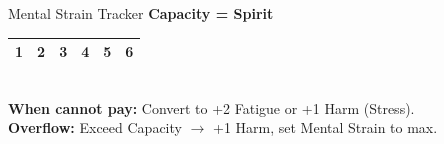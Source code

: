 \documentclass[10pt]{article}
\begin{document}
\begin{minipage}[t]{0.48\linewidth}
    \vspace{0.5em}
    
    \begin{charbox}{Mental Strain Tracker}
        \textbf{Capacity = Spirit} \underline{\hspace{1.5cm}}\\
        \begin{tabular}{|p{1cm}|p{1cm}|p{1cm}|p{1cm}|p{1cm}|p{1cm}|}
            \hline
            1 & 2 & 3 & 4 & 5 & 6 \\
            \hline
        \end{tabular}\\
        \textbf{When cannot pay:} Convert to +2 Fatigue or +1 Harm (Stress).\\
        \textbf{Overflow:} Exceed Capacity $\rightarrow$ +1 Harm, set Mental Strain to max.
    \end{charbox}
\end{minipage}
\hfill
\end{document}
